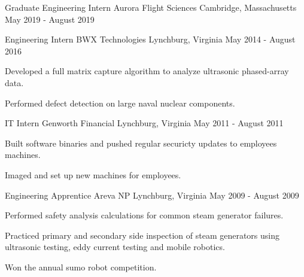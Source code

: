 

\begin{cventries}

  \scventry
    {Graduate Engineering Intern} %
    {Aurora Flight Sciences} %
    {Cambridge, Massachusetts} %
    {May 2019 - August 2019} %

  \cventry
    {Engineering Intern}
    {BWX Technologies}
    {Lynchburg, Virginia}
    {May 2014 - August 2016}
    {
      \begin{cvitems}
        \item Developed a full matrix capture algorithm to analyze ultrasonic phased-array data.
        \item Performed defect detection on large naval nuclear components.
      \end{cvitems}
    }

  \cventry
    {IT Intern}
    {Genworth Financial}
    {Lynchburg, Virginia}
    {May 2011 - August 2011}
    {
      \begin{cvitems}
        \item Built software binaries and pushed regular securicty updates to employees machines.
        \item Imaged and set up new machines for employees.
      \end{cvitems}
    }

  \cventry
    {Engineering Apprentice}
    {Areva NP}
    {Lynchburg, Virginia}
    {May 2009 - August 2009}
    {
      \begin{cvitems}
        \item Performed safety analysis calculations for common steam generator failures.
        \item Practiced primary and secondary side inspection of steam generators using ultrasonic testing, eddy current testing and mobile robotics. 
        \item Won the annual sumo robot competition.
      \end{cvitems}
    }

\end{cventries}
